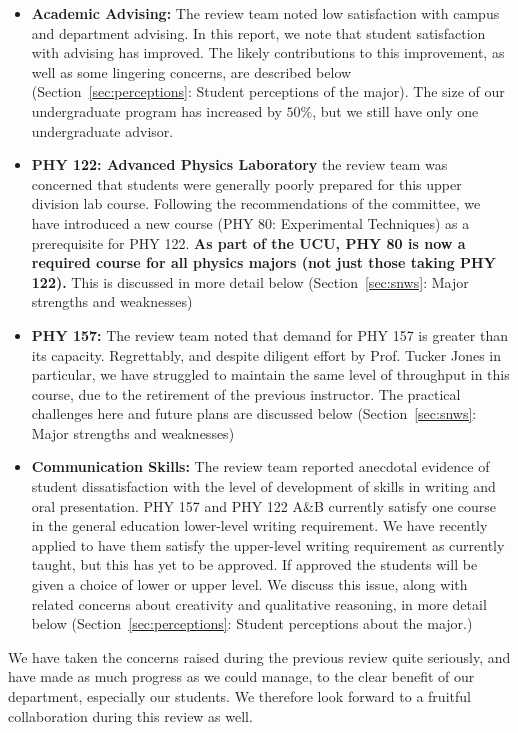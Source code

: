 \documentclass[12pt]{article}
\begin{document}
\begin{itemize}
 \item {\bf Academic Advising:} The review team noted low satisfaction
   with campus and department advising.  In this report, we note that
   student satisfaction with advising has improved.  The likely
   contributions to this improvement, as well as some lingering
   concerns, are described below (Section~\ref{sec:perceptions}:
   Student perceptions of the major).  The size of our undergraduate
   program has increased by $50\%$, but we still have only one
   undergraduate advisor.

 \item {\bf PHY 122: Advanced Physics Laboratory} the review team was
   concerned that students were generally poorly prepared for this
   upper division lab course.  Following the recommendations of the
   committee, we have introduced a new course (PHY 80: Experimental
   Techniques) as a prerequisite for PHY 122.  {\bf As part of the
     UCU, PHY 80 is now a required course for all physics majors (not
     just those taking PHY 122).}  This is discussed in more detail
   below (Section~\ref{sec:snws}: Major strengths and weaknesses)
  
 \item {\bf PHY 157:} The review team noted that demand for PHY 157 is
   greater than its capacity.  Regrettably, and despite diligent
   effort by Prof. Tucker Jones in particular, we have struggled to
   maintain the same level of throughput in this course, due to the
   retirement of the previous instructor.  The practical challenges
   here and future plans are discussed below (Section~\ref{sec:snws}:
   Major strengths and weaknesses)

 \item {\bf Communication Skills:} The review team reported anecdotal
   evidence of student dissatisfaction with the level of development
   of skills in writing and oral presentation.  PHY 157 and PHY 122
   A\&B currently satisfy one course in the general education
   lower-level writing requirement.  We have recently applied to have
   them satisfy the upper-level writing requirement as currently
   taught, but this has yet to be approved.  If approved the students
   will be given a choice of lower or upper level.  We discuss this
   issue, along with related concerns about creativity and qualitative
   reasoning, in more detail below (Section~\ref{sec:perceptions}:
   Student perceptions about the major.)
\end{itemize}
We have taken the concerns raised during the previous review quite
seriously, and have made as much progress as we could manage, to the
clear benefit of our department, especially our students.  We
therefore look forward to a fruitful collaboration during this review
as well.
\end{document}
